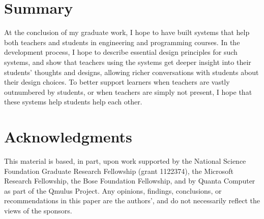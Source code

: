 \documentclass{sigchi}
\begin{document}
\section{Summary}
At the conclusion of my graduate work, I hope to have built systems that help both teachers and students in engineering and programming courses. In the development process, I hope to describe essential design principles for such systems, and show that teachers using the systems get deeper insight into their students' thoughts and designs, allowing richer conversations with students about their design choices. To better support learners when teachers are vastly outnumbered by students, or when teachers are simply not present, I hope that these systems help students help each other.

\section{Acknowledgments}

This material is based, in part, upon work supported by the National Science Foundation Graduate Research Fellowship (grant 1122374), the Microsoft Research Fellowship, the Bose Foundation Fellowship, and by Quanta Computer as part of the Qmulus Project.  Any opinions, findings, conclusions, or recommendations in this paper are the authors', and do not necessarily reflect the views of the sponsors.

%
%
%
%
%
\balance




\end{document}
